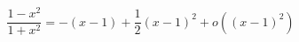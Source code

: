 \begin{displaymath}
  \frac{1-x^2}{1+x^2} = -(x-1) + \frac{1}{2}(x-1)^2 + o((x-1)^2)
\end{displaymath}
